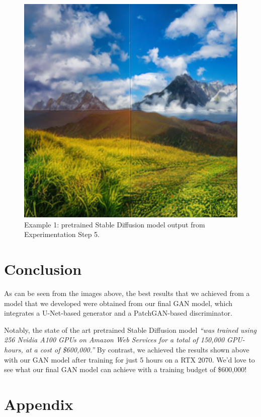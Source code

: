 \documentclass[sigconf]{acmart}
\begin{document}
\begin{figure}[h!]
    \centering
    \includegraphics[width=\linewidth]{stable_diffusion_step_5}
    \caption{Example 1: pretrained Stable Diffusion model output from Experimentation Step 5.}
    \label{fig:stable_diffusion_step_5}
\end{figure}

\section*{Conclusion}

As can be seen from the images above, the best results that we achieved from a model that we developed were obtained from our final GAN model, which integrates a U-Net-based generator and a PatchGAN-based discriminator.

Notably, the state of the art pretrained Stable Diffusion model \textit{“was trained using 256 Nvidia A100 GPUs on Amazon Web Services for a total of 150,000 GPU-hours, at a cost of \$600,000.”} By contrast, we achieved the results shown above with our GAN model after training for just 5 hours on a RTX 2070. We’d love to see what our final GAN model can achieve with a training budget of \$600,000!

\section*{Appendix}
\end{document}
